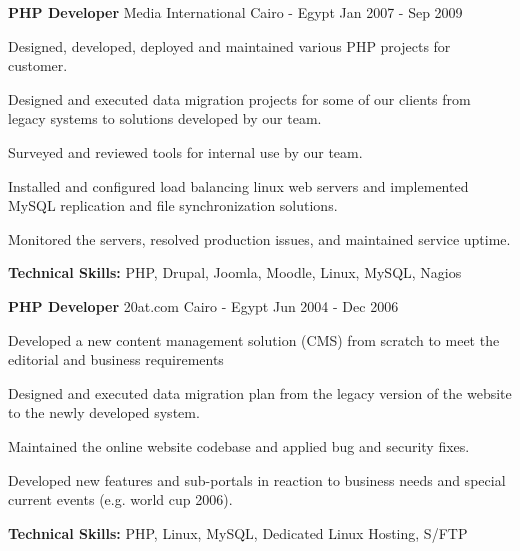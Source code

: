 \begin{cventries}
	\cventry
	{\textbf{PHP Developer}} %
	{Media International} %
	{Cairo - Egypt} %
	{Jan 2007 - Sep 2009} %
	{
		\begin{cvitems} %
			\item {Designed, developed, deployed and maintained various PHP projects for customer.}
			\item {Designed and executed data migration projects for some of our clients from legacy
			            systems to solutions developed by our team.}
			\item {Surveyed and reviewed tools for internal use by our team.}
			\item {Installed and configured load balancing linux web servers and implemented MySQL
			            replication and file synchronization solutions.}
			\item {Monitored the servers, resolved production issues, and maintained service uptime.}
			\item {\textbf{Technical Skills:} PHP, Drupal, Joomla, Moodle, Linux, MySQL, Nagios}
		\end{cvitems}
	}

	\cventry
	{\textbf{PHP Developer}} %
	{20at.com} %
	{Cairo - Egypt} %
	{Jun 2004 - Dec 2006} %
	{
		\begin{cvitems} %
			\item {Developed a new content management solution (CMS) from scratch to meet the editorial
			            and business requirements}
			\item {Designed and executed data migration plan from the legacy version of the website to
			            the newly developed system.}
			\item {Maintained the online website codebase and applied bug and security fixes.}
			\item {Developed new features and sub-portals in reaction to business needs and special
			            current events (e.g. world cup
			            2006).}
			\item {\textbf{Technical Skills:} PHP, Linux, MySQL, Dedicated Linux Hosting, S/FTP}
		\end{cvitems}
	}
\end{cventries}
